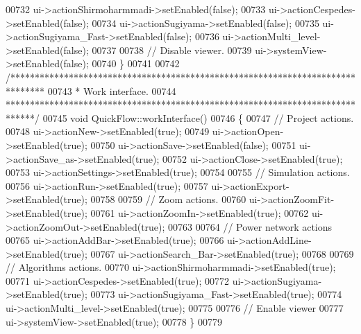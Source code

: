 \begin{DoxyCode}
00732   ui->actionShirmoharmmadi->setEnabled(\textcolor{keyword}{false});
00733   ui->actionCespedes->setEnabled(\textcolor{keyword}{false});
00734   ui->actionSugiyama->setEnabled(\textcolor{keyword}{false});
00735   ui->actionSugiyama\_Fast->setEnabled(\textcolor{keyword}{false});
00736   ui->actionMulti\_level->setEnabled(\textcolor{keyword}{false});
00737 
00738   \textcolor{comment}{// Disable viewer.}
00739   ui->systemView->setEnabled(\textcolor{keyword}{false});
00740 \}
00741 
00742 \textcolor{comment}{/*******************************************************************************}
00743 \textcolor{comment}{ * Work interface.}
00744 \textcolor{comment}{ ******************************************************************************/}
00745 \textcolor{keywordtype}{void} QuickFlow::workInterface()
00746 \{
00747   \textcolor{comment}{// Project actions.}
00748   ui->actionNew->setEnabled(\textcolor{keyword}{true});
00749   ui->actionOpen->setEnabled(\textcolor{keyword}{true});
00750   ui->actionSave->setEnabled(\textcolor{keyword}{false});
00751   ui->actionSave\_as->setEnabled(\textcolor{keyword}{true});
00752   ui->actionClose->setEnabled(\textcolor{keyword}{true});
00753   ui->actionSettings->setEnabled(\textcolor{keyword}{true});
00754 
00755   \textcolor{comment}{// Simulation actions.}
00756   ui->actionRun->setEnabled(\textcolor{keyword}{true});
00757   ui->actionExport->setEnabled(\textcolor{keyword}{true});
00758 
00759   \textcolor{comment}{// Zoom actions.}
00760   ui->actionZoomFit->setEnabled(\textcolor{keyword}{true});
00761   ui->actionZoomIn->setEnabled(\textcolor{keyword}{true});
00762   ui->actionZoomOut->setEnabled(\textcolor{keyword}{true});
00763 
00764   \textcolor{comment}{// Power network actions}
00765   ui->actionAddBar->setEnabled(\textcolor{keyword}{true});
00766   ui->actionAddLine->setEnabled(\textcolor{keyword}{true});
00767   ui->actionSearch\_Bar->setEnabled(\textcolor{keyword}{true});
00768 
00769   \textcolor{comment}{// Algorithms actions.}
00770   ui->actionShirmoharmmadi->setEnabled(\textcolor{keyword}{true});
00771   ui->actionCespedes->setEnabled(\textcolor{keyword}{true});
00772   ui->actionSugiyama->setEnabled(\textcolor{keyword}{true});
00773   ui->actionSugiyama\_Fast->setEnabled(\textcolor{keyword}{true});
00774   ui->actionMulti\_level->setEnabled(\textcolor{keyword}{true});
00775 
00776   \textcolor{comment}{// Enable viewer}
00777   ui->systemView->setEnabled(\textcolor{keyword}{true});
00778 \}
00779 
\end{DoxyCode}
